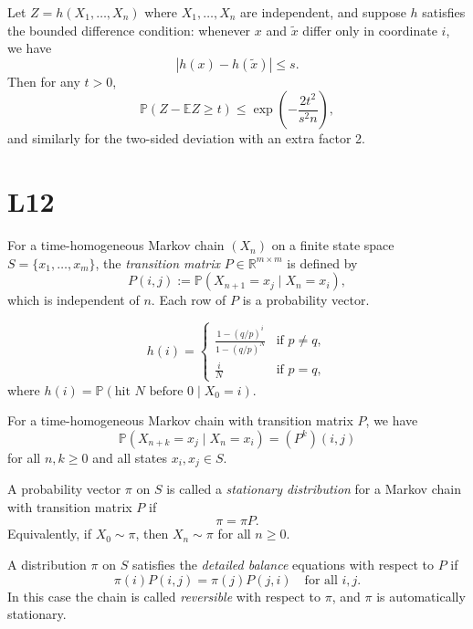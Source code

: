 \documentclass[answers,12pt,addpoints]{exam}
\begin{document}
\begin{theorem}
Let $Z = h(X_1,\dots,X_n)$ where $X_1,\dots,X_n$ are independent, and suppose $h$ satisfies the bounded difference condition: whenever $x$ and $\tilde x$ differ only in coordinate $i$, we have
\[
|h(x) - h(\tilde x)| \le s.
\]
Then for any $t>0$,
\[
\mathbb{P}(Z - \mathbb{E}Z \ge t) \le \exp\left(-\frac{2t^2}{s^2 n}\right),
\]
and similarly for the two-sided deviation with an extra factor 2.
\end{theorem}

\section{L12}

\begin{definition}
For a time-homogeneous Markov chain $(X_n)$ on a finite state space $S=\{x_1,\dots,x_m\}$, the \emph{transition matrix} $P\in\mathbb{R}^{m\times m}$ is defined by
\[
P(i,j) := \mathbb{P}(X_{n+1} = x_j \mid X_n = x_i),
\]
which is independent of $n$. Each row of $P$ is a probability vector.
\end{definition}

\begin{example}
  $$ h(i) =\begin{cases}
    \frac{1 - (q/p)^i}{1 - (q/p)^N} & \text{if } p\neq q,\\
    \frac{i}{N} & \text{if } p=q,
  \end{cases} $$
  where $h(i) = \mathbb{P}(\text{hit } N \text{ before } 0 \mid X_0 = i)$.
\end{example}

\begin{theorem}
For a time-homogeneous Markov chain with transition matrix $P$, we have
\[
\mathbb{P}(X_{n+k} = x_j \mid X_n = x_i) = (P^k)(i,j)
\]
for all $n,k\ge 0$ and all states $x_i,x_j\in S$.
\end{theorem}

\begin{definition}
A probability vector $\pi$ on $S$ is called a \emph{stationary distribution} for a Markov chain with transition matrix $P$ if
\[
\pi = \pi P.
\]
Equivalently, if $X_0\sim\pi$, then $X_n\sim\pi$ for all $n\ge 0$.
\end{definition}

\begin{definition}
A distribution $\pi$ on $S$ satisfies the \emph{detailed balance} equations with respect to $P$ if
\[
\pi(i)P(i,j) = \pi(j)P(j,i)\quad \text{for all } i,j.
\]
In this case the chain is called \emph{reversible} with respect to $\pi$, and $\pi$ is automatically stationary.
\end{definition}
\end{document}
